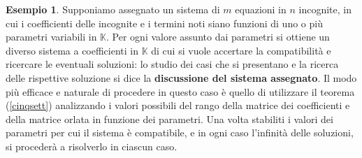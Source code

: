 \documentclass{article}
\theoremstyle{plain}
\theoremstyle{definition}
\newtheorem{exmp}{Esempio}[section]
\theoremstyle{remark}
\begin{document}
\vspace{10pt}

\begin{exmp}
    Supponiamo assegnato un sistema di $m$ equazioni in $n$ incognite, in cui i coefficienti delle incognite e i termini noti siano funzioni di uno o più parametri variabili in $\mathbb{K}$. 
    Per ogni valore assunto dai parametri si ottiene un diverso sistema a coefficienti in $\mathbb{K}$ di cui si vuole accertare la compatibilità e ricercare le eventuali soluzioni: lo studio dei casi 
    che si presentano e la ricerca delle rispettive soluzione si dice la \textbf{discussione del sistema assegnato}. Il modo più efficace e naturale di procedere in questo caso è quello di utilizzare 
    il teorema (\ref{cinqsett}) analizzando i valori possibili del rango della matrice dei coefficienti e della matrice orlata in funzione dei parametri. Una volta stabiliti i valori dei parametri per cui il sistema è compatibile, 
    e in ogni caso l'infinità delle soluzioni, si procederà a risolverlo in ciascun caso.
\end{exmp}

\vspace{10pt}
\end{document}
